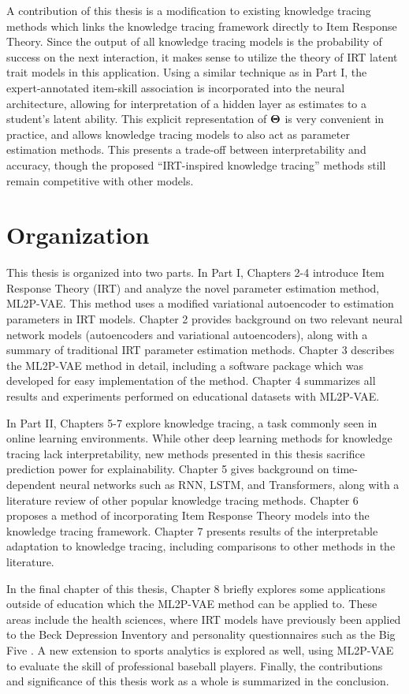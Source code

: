 A contribution of this thesis is a modification to existing knowledge tracing methods which links the knowledge tracing framework directly to Item Response Theory. Since the output of all knowledge tracing models is the probability of success on the next interaction, it makes sense to utilize the theory of IRT latent trait models in this application. Using a similar technique as in Part I, the expert-annotated item-skill association is incorporated into the neural architecture, allowing for interpretation of a hidden layer as estimates to a student's latent ability. This explicit representation of $\boldsymbol{\Theta}$ is very convenient in practice, and allows knowledge tracing models to also act as parameter estimation methods. This presents a trade-off between interpretability and accuracy, though the proposed ``IRT-inspired knowledge tracing'' methods still remain competitive with other models.

\section{Organization}
This thesis is organized into two parts. In Part I, Chapters 2-4 introduce Item Response Theory (IRT) and analyze the novel parameter estimation method, ML2P-VAE. This method uses a modified variational autoencoder to estimation parameters in IRT models. Chapter 2 provides background on two relevant neural network models (autoencoders and variational autoencoders), along with a summary of traditional IRT parameter estimation methods. Chapter 3 describes the ML2P-VAE method in detail, including a software package which was developed for easy implementation of the method. Chapter 4 summarizes all results and experiments performed on educational datasets with ML2P-VAE.

In Part II, Chapters 5-7 explore knowledge tracing, a task commonly seen in online learning environments. While other deep learning methods for knowledge tracing lack interpretability, new methods presented in this thesis sacrifice prediction power for explainability. Chapter 5 gives background on time-dependent neural networks such as RNN, LSTM, and Transformers, along with a literature review of other popular knowledge tracing methods. Chapter 6 proposes a method of incorporating Item Response Theory models into the knowledge tracing framework. Chapter 7 presents results of the interpretable adaptation to knowledge tracing, including comparisons to other methods in the literature.

In the final chapter of this thesis, Chapter 8 briefly explores some applications outside of education which the ML2P-VAE method can be applied to. These areas include the health sciences, where IRT models have previously been applied to the Beck Depression Inventory \cite{beck1996, fragoso2013, huang2015} and personality questionnaires such as the Big Five \cite{robie2001}. A new extension to sports analytics is explored as well, using ML2P-VAE to evaluate the skill of professional baseball players. Finally, the contributions and significance of this thesis work as a whole is summarized in the conclusion.

